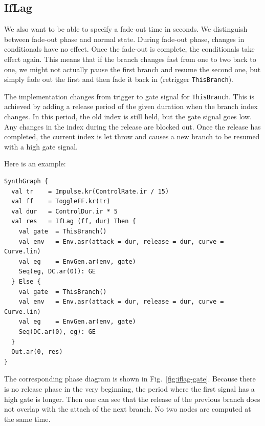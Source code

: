 \documentclass[11pt,a4paper]{article}
\newcommand{\figref}[1]{Fig.~\ref{#1}}
\begin{document}
\subsection{IfLag}

We also want to be able to specify a fade-out time in seconds. We distinguish between fade-out phase and normal state. During fade-out phase, changes in conditionals have no effect. Once the fade-out is complete, the conditionals take effect again. This means that if the branch changes fast from one to two back to one, we might not actually pause the first branch and resume the second one, but simply fade out the first and then fade it back in (retrigger \Verb!ThisBranch!).

The implementation changes from trigger to gate signal for \Verb!ThisBranch!. This is achieved by adding a release period of the given duration when the branch index changes. In this period, the old index is still held, but the gate signal goes low. Any changes in the index during the release are blocked out. Once the release has completed, the current index is let throw and causes a new branch to be resumed with a high gate signal.

Here is an example:
%
\begin{verbatim}
SynthGraph {
  val tr    = Impulse.kr(ControlRate.ir / 15)
  val ff    = ToggleFF.kr(tr)
  val dur   = ControlDur.ir * 5
  val res   = IfLag (ff, dur) Then {
    val gate  = ThisBranch()
    val env   = Env.asr(attack = dur, release = dur, curve = Curve.lin)
    val eg    = EnvGen.ar(env, gate)
    Seq(eg, DC.ar(0)): GE
  } Else {
    val gate  = ThisBranch()
    val env   = Env.asr(attack = dur, release = dur, curve = Curve.lin)
    val eg    = EnvGen.ar(env, gate)
    Seq(DC.ar(0), eg): GE
  }
  Out.ar(0, res)
}
\end{verbatim}
%
The corresponding phase diagram is shown in \figref{fig:iflag-gate}. Because there is no release phase in the very beginning, the period where the first signal has a high gate is longer. Then one can see that the release of the previous branch does not overlap with the attach of the next branch. No two nodes are computed at the same time.
\end{document}
